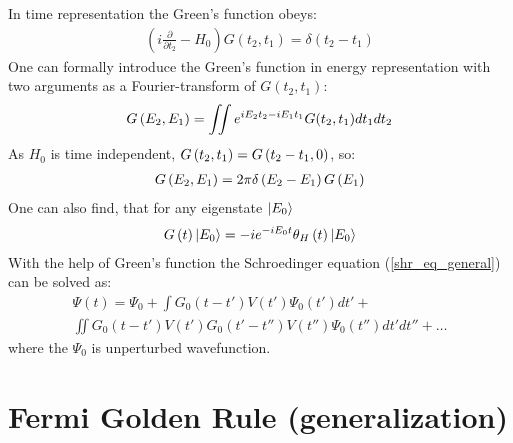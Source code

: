 In time representation the Green's function obeys:
\begin{gather}
	\left(i\frac{\partial}{\partial t_{2}}-H_{0}\right)G(t_{2},t_{1})=\delta(t_{2}-t_{1})
\end{gather}
One can formally introduce the Green's function in energy representation with two arguments as a Fourier-transform of $ G(t_{2},t_{1}) $:
\begin{gather}
	G\left(E_2,E_1\right)
	=
	\iint
	e^{iE_2t_2-iE_1t_1}
	G(t_{2},t_{1})
	dt_1
	dt_2
\end{gather}
As $ H_0 $ is time independent, $ G\left(t_2,t_1\right)=G\left(t_2-t_1,0\right) $, so:
\begin{gather}
	G\left(E_2,E_1\right)=2\pi \delta\left(E_2-E_1\right) G\left(E_1\right)
\end{gather}
One can also find, that for any eigenstate $ \ket{E_0} $
\begin{gather}
	G\left(t\right)\ket{E_0}
	=
	-ie^{-iE_0t}\theta_H\left(t\right)\ket{E_0}
\end{gather}
With the help of Green's function the Schroedinger equation (\ref{shr_eq_general}) can be solved as:
\begin{multline}
\Psi(t)=\Psi_{0}+\int G_{0}(t-t')V(t')\Psi_{0}(t')dt'+
\\
\iint G_{0}(t-t')V(t')G_{0}(t'-t'')V(t'')\Psi_{0}(t'')dt'dt''+\dots
\end{multline}
where the $ \Psi_0 $ is unperturbed wavefunction.
\section{Fermi Golden Rule (generalization)}